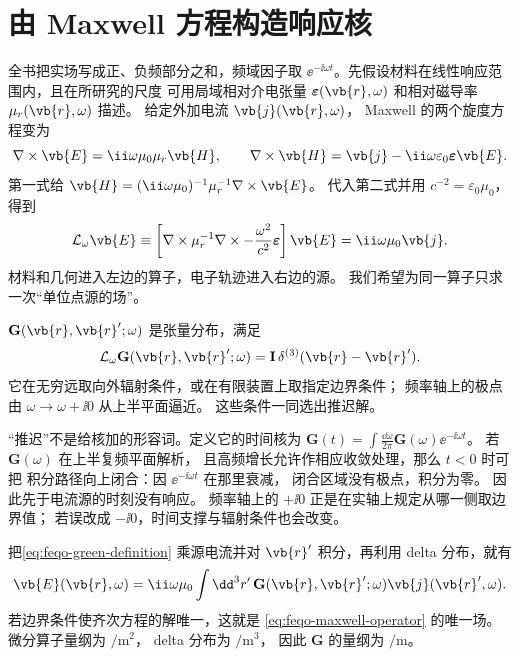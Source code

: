 \section{由 Maxwell 方程构造响应核}
\label{sec:feqo-green}

全书把实场写成正、负频部分之和，频域因子取
\(\ee^{-\ii\omega t}\)。先假设材料在线性响应范围内，且在所研究的尺度
可用局域相对介电张量 \(\boldsymbol\varepsilon(\vb{r},\omega)\)
和相对磁导率 \(\mu_r(\vb{r},\omega)\) 描述。
给定外加电流 \(\vb{j}(\vb{r},\omega)\)，
Maxwell 的两个旋度方程变为
\[
\nabla\times\vb{E}=\ii\omega\mu_0\mu_r\vb{H},\qquad
\nabla\times\vb{H}
=\vb{j}-\ii\omega\varepsilon_0
\boldsymbol\varepsilon\vb{E}.
\]
第一式给
\(\vb{H}=(\ii\omega\mu_0)^{-1}\mu_r^{-1}\nabla\times\vb{E}\)。
代入第二式并用 \(c^{-2}=\varepsilon_0\mu_0\)，得到
\begin{equation}
\mathcal L_\omega\vb{E}
\equiv
\left[\nabla\times\mu_r^{-1}\nabla\times
-\frac{\omega^2}{c^2}\boldsymbol\varepsilon\right]\vb{E}
=\ii\omega\mu_0\vb{j} .
\label{eq:feqo-maxwell-operator}
\end{equation}
材料和几何进入左边的算子，电子轨迹进入右边的源。
我们希望为同一算子只求一次“单位点源的场”。

\begin{definition}[推迟 Green 张量]
\(\mathbf G(\vb{r},\vb{r}';\omega)\) 是张量分布，满足
\begin{equation}
\mathcal L_\omega\mathbf G(\vb{r},\vb{r}';\omega)
=\mathbf I\,\delta^{(3)}(\vb{r}-\vb{r}').
\label{eq:feqo-green-definition}
\end{equation}
它在无穷远取向外辐射条件，或在有限装置上取指定边界条件；
频率轴上的极点由 \(\omega\to\omega+\ii0\) 从上半平面逼近。
这些条件一同选出推迟解。
\end{definition}

“推迟”不是给核加的形容词。定义它的时间核为
\(\mathbf G(t)=\int\frac{\dd\omega}{2\pi}
\mathbf G(\omega)\ee^{-\ii\omega t}\)。
若 \(\mathbf G(\omega)\) 在上半复频平面解析，
且高频增长允许作相应收敛处理，那么 \(t<0\) 时可把
积分路径向上闭合：因 \(\ee^{-\ii\omega t}\) 在那里衰减，
闭合区域没有极点，积分为零。
因此先于电流源的时刻没有响应。
频率轴上的 \(+\ii0\) 正是在实轴上规定从哪一侧取边界值；
若误改成 \(-\ii0\)，时间支撑与辐射条件也会改变。

把\cref{eq:feqo-green-definition} 乘源电流并对
\(\vb{r}'\) 积分，再利用 delta 分布，就有
\begin{equation}
\vb{E}(\vb{r},\omega)
=\ii\omega\mu_0\int\dd^3r'\,
\mathbf G(\vb{r},\vb{r}';\omega)
\vb{j}(\vb{r}',\omega).
\label{eq:feqo-green-source-field}
\end{equation}
若边界条件使齐次方程的解唯一，这就是
\cref{eq:feqo-maxwell-operator} 的唯一场。
微分算子量纲为 \(\si{\per\square\metre}\)，
delta 分布为 \(\si{\per\cubic\metre}\)，
因此 \(\mathbf G\) 的量纲为 \(\si{\per\metre}\)。


